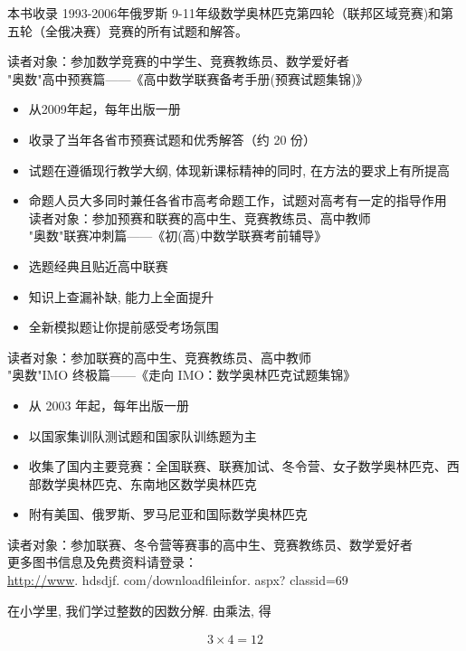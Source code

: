 \documentclass[10pt]{article}
\begin{document}
本书收录 1993-2006年俄罗斯 9-11年级数学奥林匹克第四轮（联邦区域竞赛)和第五轮（全俄决赛）竞赛的所有试题和解答。

读者对象：参加数学竞赛的中学生、竞赛教练员、数学爱好者\\
"奥数"高中预赛篇——《高中数学联赛备考手册(预赛试题集锦)》

\begin{itemize}
  \item 从2009年起，每年出版一册
  \item 收录了当年各省市预赛试题和优秀解答（约 20 份）
  \item 试题在遵循现行教学大纲, 体现新课标精神的同时, 在方法的要求上有所提高
  \item 命题人员大多同时兼任各省市高考命题工作，试题对高考有一定的指导作用\\
读者对象：参加预赛和联赛的高中生、竞赛教练员、高中教师\\
"奥数"联赛冲刺篇——《初(高)中数学联赛考前辅导》
  \item 选题经典且贴近高中联赛
  \item 知识上查漏补缺, 能力上全面提升
  \item 全新模拟题让你提前感受考场氛围
\end{itemize}

读者对象：参加联赛的高中生、竞赛教练员、高中教师\\
"奥数"IMO 终极篇——《走向 IMO：数学奥林匹克试题集锦》

\begin{itemize}
  \item 从 2003 年起，每年出版一册
  \item 以国家集训队测试题和国家队训练题为主
  \item 收集了国内主要竞赛：全国联赛、联赛加试、冬令营、女子数学奥林匹克、西部数学奥林匹克、东南地区数学奥林匹克
  \item 附有美国、俄罗斯、罗马尼亚和国际数学奥林匹克
\end{itemize}

读者对象：参加联赛、冬令营等赛事的高中生、竞赛教练员、数学爱好者\\
更多图书信息及免费资料请登录：\\
\href{http://www}{http://www}. hdsdjf. com/downloadfileinfor. aspx? classid=69

在小学里, 我们学过整数的因数分解. 由乘法, 得

\begin{align*}
3 \times 4=12
\end{align*}
\end{document}
